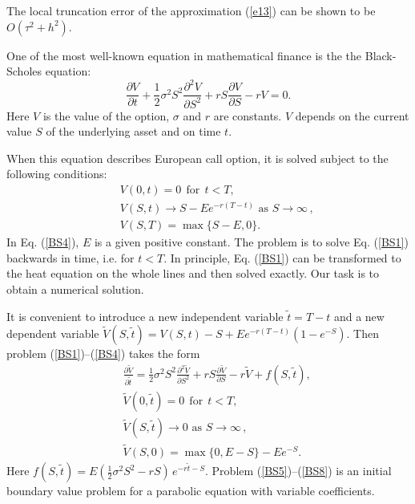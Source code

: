\begin{example}
The local truncation error of the approximation (\ref{e13}) can be shown to be
$O(\tau^2+h^2)$.
\end{example}
 
\begin{example} One of the most well-known equation in mathematical finance is the
the Black-Scholes equation:
\begin{equation}
    \frac{\partial V}{\partial t}+\frac{1}{2}\sigma^{2}S^{2}\frac{\partial^{2} V}{\partial S^{2}}+rS\frac{\partial V}{\partial S}
    -rV=0. \label{BS1}
\end{equation}
Here $V$ is the value of the option, $\sigma$ and $r$ are constants.
$V$ depends on the current value $S$ of the underlying asset and on time $t$.

When this equation describes European call option, it is solved subject
to the following conditions:
\begin{eqnarray}
    &&V(0,t)=0 \ \ \text{for} \ \ t<T, \label{BS2} \\
    &&V(S,t)\rightarrow S-Ee^{-r(T-t)}\text{ as }S\rightarrow\infty\, , \label{BS3} \\
    &&V(S,T)=\max\{S-E,0\}. \label{BS4}
\end{eqnarray}
In Eq. (\ref{BS4}), $E$ is a given positive constant. The problem is to solve
Eq. (\ref{BS1}) backwards in time, i.e. for $t<T$. In principle, Eq. (\ref{BS1})
can be transformed to the heat equation on the whole lines and then solved exactly.
Our task is to obtain a numerical solution.

It is convenient to introduce a new independent variable $\tilde{t}=T-t$
and a new dependent variable $\tilde{V}(S,\tilde{t})=V(S,t)-S+Ee^{-r(T-t)}(1-e^{-S})$. Then problem (\ref{BS1})--(\ref{BS4})
takes the form
\begin{eqnarray}
    &&\frac{\partial \tilde{V}}{\partial \tilde{t}}=\frac{1}{2}\sigma^{2}S^{2}
    \frac{\partial^{2} \tilde{V}}{\partial S^{2}}+rS\frac{\partial \tilde{V}}{\partial S}
    -r\tilde{V}+ f(S, \tilde{t}), \label{BS5} \\
    &&\tilde{V}(0,\tilde{t})=0 \ \ \text{for} \ \ t<T, \label{BS6} \\
    &&\tilde{V}(S,\tilde{t})\rightarrow 0\text{ as }S\rightarrow\infty\, , \label{BS7} \\
    &&\tilde{V}(S,0)=\max\{0,E-S\}-E e^{-S}. \label{BS8}
\end{eqnarray}
Here $f(S, \tilde{t})=E \left(\frac{1}{2}\sigma^2 S^2 - r S\right)\, e^{-r\tilde{t}-S}$.
Problem (\ref{BS5})--(\ref{BS8}) is an initial boundary value problem for a parabolic
equation with variable coefficients.


\end{example}
